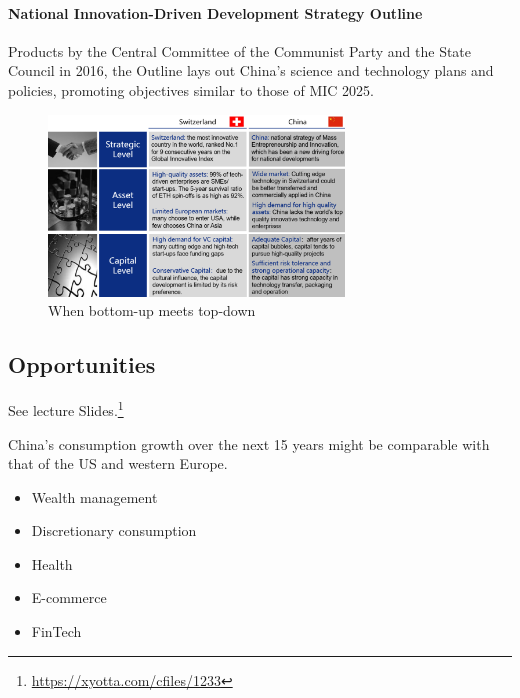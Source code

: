 \paragraph{National Innovation-Driven Development Strategy Outline}

Products by the Central Committee of the Communist Party and the State Council
in 2016, the Outline lays out China's science and technology plans and policies,
promoting objectives similar to those of MIC 2025.

\begin{figure}[H]
    \centering
    \includegraphics[width=0.7\textwidth]{Pictures/When_bottom_up_meets_top_down.png}
    \caption{When bottom-up meets top-down}
\end{figure}


\subsection{Opportunities}

See lecture Slides.\footnote{\url{https://xyotta.com/cfiles/1233}}

\vspace{1\baselineskip}

China's consumption growth over the next 15 years might be comparable with
that of the US and western Europe.

\begin{itemize}
    \item Wealth management
    \item Discretionary consumption
    \item Health
    \item E-commerce
    \item FinTech
\end{itemize}




